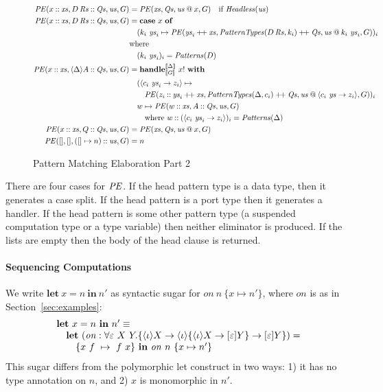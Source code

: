 \documentclass[11pt]{article}
\makeatletter
\newcommand{\sem}[1]{\llbracket{#1}\rrbracket}
\newcommand{\bstack}{\begin{array}[t]{@{}l@{}}}
\newcommand{\estack}{\end{array}}
\newcommand{\key}[1]{\textbf{#1}} %
\newcommand{\var}{\mathit}        %
\newcommand{\handleSymbol}{\rightarrow}
\newcommand{\handle}[2]{{#1} \handleSymbol {#2}}
\newcommand{\thunk}[1]{\{{#1}\}}
\newcommand{\adj}{\Delta}
\newcommand{\evd}{\varepsilon}
\newcommand{\effin}[1]{\langle {#1} \rangle}
\newcommand{\effout}[1]{[{#1}]}
\newcommand{\id}{\iota}
\makeatother
\begin{document}
\begin{figure*}
\small
\begin{align*}
\PE(x \cons \xs, D\,\Rs \cons \Qs, \us, G) &=
    \PE(\xs, \Qs, \us \proj x, G)  \quad \text{if } \hdless(\us)\\
\PE(x \cons \xs, D\,\Rs \cons \Qs, \us, G) &=
    \key{case}~x~\key{of}\\
    & \quad
      (k_i~\ys_i \mapsto
      \PE(\ys_i \concat \xs, \PatternTypes(D\,\Rs, k_i) \concat \Qs, \us \proj k_i~\ys_i, G))_i\\
    & \text{where} \\
    & \quad (k_i~\ys_i)_i = \Patterns(D) \\
\PE(x \cons \xs, \effin{\adj}A \cons \Qs, \us, G) &=
    \key{handle}^{\sem{\adj}}_{\sem{G}}~x!~\key{with} \\
    & \quad
      (\effin{\handle{c_i~\ys_i}{z_i}} \mapsto \\
         & \quad \quad \PE(z_i \cons \ys_i \concat \xs, \PatternTypes(\adj, c_i) \concat \Qs, \us \proj \effin{\handle{c_i~\ys}{z_i}}, G))_i \\
    & \quad  w \mapsto \PE(w \cons \xs, A \cons \Qs, \us, G) \,\\
    & \quad\quad \text{where}\,\, w \cons (\effin{\handle{c_i~\ys_i}{z_i}})_i = \Patterns(\adj) \\
\PE(x \cons \xs, Q \cons \Qs, \us, G) &= \PE(\xs, \Qs, \us \proj x, G) \\
\PE(\emptylist, \emptylist, (\emptylist \mapsto n) \cons \us, G) &= n \\
\end{align*}
\caption{Pattern Matching Elaboration Part 2}
\label{fig:pattern-matching-elaboration-2}
\end{figure*}
%
There are four cases for $\mathit{PE}$. If the head pattern type is a data type,
then it generates a case split. If the head pattern is a port type
then it generates a handler. If the head pattern is some other pattern
type (a suspended computation type or a type variable) then neither
eliminator is produced. If the lists are empty then the body of the
head clause is returned.

\paragraph{Sequencing Computations}
We write $\key{let}~x=n~\key{in}~n'$ as syntactic sugar for
$\var{on}~n~\thunk{x \mapsto n'}$, where $\var{on}$ is as in
Section~\ref{sec:examples}:
%
\[
\bstack
\key{let}~x=n~\key{in}~n' \equiv \\
\quad \key{let}~
  (\var{on} :
    \forall \evd~X~Y.
       \thunk{\effin{\id}X \to \effin{\id}\thunk{\effin{\id}X \to \effout{\evd}Y} \to \effout{\evd}Y}) = \\
  \qquad \thunk{x~f~\mapsto~f~x}~\key{in}~\var{on}~n~\thunk{x \mapsto n'}
\estack
\]
This sugar differs from the polymorphic let construct in two ways: 1)
it has no type annotation on $n$, and 2) $x$ is monomorphic in $n'$.
\medskip
\end{document}
